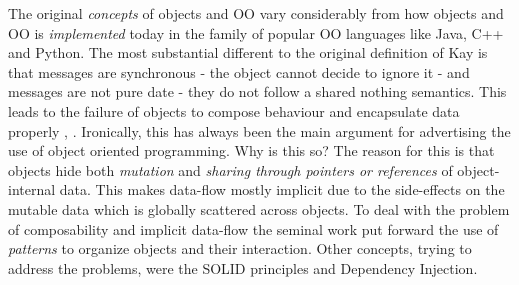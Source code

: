 

The original \textit{concepts} of objects and OO vary considerably from how objects and OO is \textit{implemented} today in the family of popular OO languages like Java, C++ and Python. The most substantial different to the original definition of Kay is that messages are synchronous - the object cannot decide to ignore it - and messages are not pure date - they do not follow a shared nothing semantics.
This leads to the failure of objects to compose behaviour and encapsulate data properly \cite{bill_what_2017}, \cite{erkki_lindpere_why_2013}. Ironically, this has always been the main argument for advertising the use of object oriented programming. Why is this so?
The reason for this is that objects hide both \textit{mutation} and \textit{sharing through pointers or references} of object-internal data. This makes data-flow mostly implicit due to the side-effects on the mutable data which is globally scattered across objects. To deal with the problem of composability and implicit data-flow the seminal work \cite{gamma_design_1994} put forward the use of \textit{patterns} to organize objects and their interaction. Other concepts, trying to address the problems, were the SOLID principles and Dependency Injection. 

